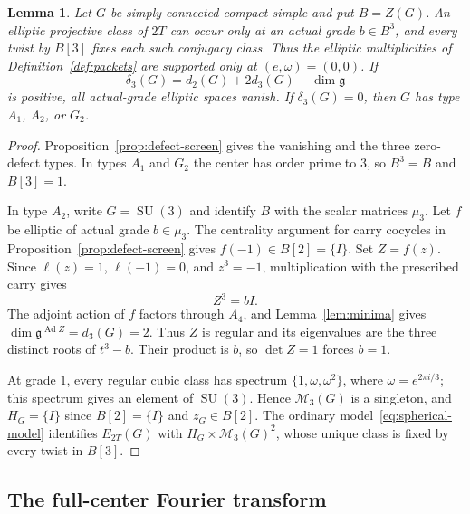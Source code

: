 \documentclass[11pt,a4paper,reqno]{amsart}
\theoremstyle{plain}
\newtheorem{lemma}[theorem]{Lemma}
\theoremstyle{definition}
\theoremstyle{remark}
\numberwithin{equation}{section}
\DeclareMathOperator{\Ad}{Ad}
\newcommand{\SU}{\operatorname{SU}}
\newcommand{\fg}{\mathfrak g}
\newcommand{\cM}{\mathcal M}
\begin{document}
\begin{lemma}\label{lem:tetrahedral-zero-packet}
Let $G$ be simply connected compact simple and put $B=Z(G)$. An elliptic projective class of $2T$ can occur only at an actual grade $b\in B^3$, and every twist by $B[3]$ fixes each such conjugacy class. Thus the elliptic multiplicities of Definition~\ref{def:packets} are supported only at $(e,\omega)=(0,0)$. If
\[
\delta_3(G)=d_2(G)+2d_3(G)-\dim\fg
\]
is positive, all actual-grade elliptic spaces vanish. If $\delta_3(G)=0$, then $G$ has type $A_1$, $A_2$, or $G_2$.
\end{lemma}
\begin{proof}
Proposition~\ref{prop:defect-screen} gives the vanishing and the three zero-defect types. In types $A_1$ and $G_2$ the center has order prime to $3$, so $B^3=B$ and $B[3]=1$.

In type $A_2$, write $G=\SU(3)$ and identify $B$ with the scalar matrices $\mu_3$. Let $f$ be elliptic of actual grade $b\in\mu_3$. The centrality argument for carry cocycles in Proposition~\ref{prop:defect-screen} gives $f(-1)\in B[2]=\{I\}$. Set $Z=f(z)$. Since $\ell(z)=1$, $\ell(-1)=0$, and $z^3=-1$, multiplication with the prescribed carry gives
\begin{equation}\label{eq:tetrahedral-su3-relations}
Z^3=bI.
\end{equation}
The adjoint action of $f$ factors through $A_4$, and Lemma~\ref{lem:minima} gives $\dim\fg^{\Ad Z}=d_3(G)=2$. Thus $Z$ is regular and its eigenvalues are the three distinct roots of $t^3-b$. Their product is $b$, so $\det Z=1$ forces $b=1$.

At grade $1$, every regular cubic class has spectrum $\{1,\omega,\omega^2\}$, where $\omega=e^{2\pi i/3}$; this spectrum gives an element of $\SU(3)$. Hence $\cM_3(G)$ is a singleton, and $H_G=\{I\}$ since $B[2]=\{I\}$ and $z_G\in B[2]$. The ordinary model~\eqref{eq:spherical-model} identifies $E_{2T}(G)$ with $H_G\times\cM_3(G)^2$, whose unique class is fixed by every twist in $B[3]$.
\end{proof}

\subsection{The full-center Fourier transform}
\end{document}

